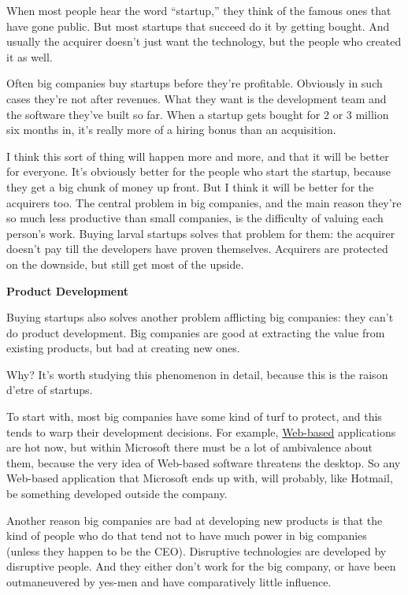 When most people hear the word ``startup,'' they think of the famous
ones that have gone public. But most startups that succeed do it by
getting bought. And usually the acquirer doesn't just want the
technology, but the people who created it as well.

Often big companies buy startups before they're profitable. Obviously in
such cases they're not after revenues. What they want is the development
team and the software they've built so far. When a startup gets bought
for 2 or 3 million six months in, it's really more of a hiring bonus
than an acquisition.

I think this sort of thing will happen more and more, and that it will
be better for everyone. It's obviously better for the people who start
the startup, because they get a big chunk of money up front. But I think
it will be better for the acquirers too. The central problem in big
companies, and the main reason they're so much less productive than
small companies, is the difficulty of valuing each person's work. Buying
larval startups solves that problem for them: the acquirer doesn't pay
till the developers have proven themselves. Acquirers are protected on
the downside, but still get most of the upside.

\textbf{Product Development}

Buying startups also solves another problem afflicting big companies:
they can't do product development. Big companies are good at extracting
the value from existing products, but bad at creating new ones.

Why? It's worth studying this phenomenon in detail, because this is the
raison d'etre of startups.

To start with, most big companies have some kind of turf to protect, and
this tends to warp their development decisions. For example,
\href{road.html}{Web-based} applications are hot now, but within
Microsoft there must be a lot of ambivalence about them, because the
very idea of Web-based software threatens the desktop. So any Web-based
application that Microsoft ends up with, will probably, like Hotmail, be
something developed outside the company.

Another reason big companies are bad at developing new products is that
the kind of people who do that tend not to have much power in big
companies (unless they happen to be the CEO). Disruptive technologies
are developed by disruptive people. And they either don't work for the
big company, or have been outmaneuvered by yes-men and have
comparatively little influence.

